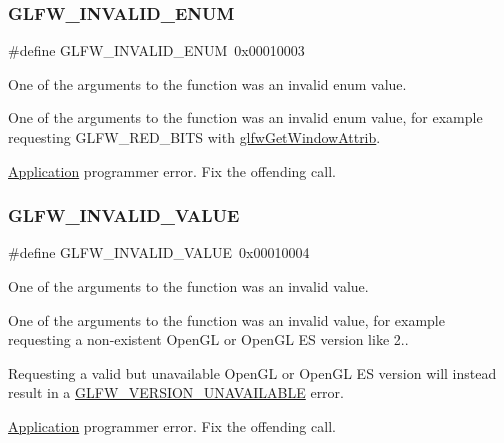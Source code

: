 \subsubsection{\texorpdfstring{G\+L\+F\+W\+\_\+\+I\+N\+V\+A\+L\+I\+D\+\_\+\+E\+N\+UM}{GLFW\_INVALID\_ENUM}\hspace{0.1cm}{\footnotesize\ttfamily [5/5]}}
{\footnotesize\ttfamily \#define G\+L\+F\+W\+\_\+\+I\+N\+V\+A\+L\+I\+D\+\_\+\+E\+N\+UM~0x00010003}



One of the arguments to the function was an invalid enum value. 

One of the arguments to the function was an invalid enum value, for example requesting G\+L\+F\+W\+\_\+\+R\+E\+D\+\_\+\+B\+I\+TS with \hyperlink{group__window_ga1bb0c7e100418e284dbb800789c63d40}{glfw\+Get\+Window\+Attrib}.

\hyperlink{classApplication}{Application} programmer error. Fix the offending call. \mbox{\label{group__errors_gaaf2ef9aa8202c2b82ac2d921e554c687}} 
\subsubsection{\texorpdfstring{G\+L\+F\+W\+\_\+\+I\+N\+V\+A\+L\+I\+D\+\_\+\+V\+A\+L\+UE}{GLFW\_INVALID\_VALUE}\hspace{0.1cm}{\footnotesize\ttfamily [1/5]}}
{\footnotesize\ttfamily \#define G\+L\+F\+W\+\_\+\+I\+N\+V\+A\+L\+I\+D\+\_\+\+V\+A\+L\+UE~0x00010004}



One of the arguments to the function was an invalid value. 

One of the arguments to the function was an invalid value, for example requesting a non-\/existent Open\+GL or Open\+GL ES version like 2..

Requesting a valid but unavailable Open\+GL or Open\+GL ES version will instead result in a \hyperlink{group__errors_gad16c5565b4a69f9c2a9ac2c0dbc89462}{G\+L\+F\+W\+\_\+\+V\+E\+R\+S\+I\+O\+N\+\_\+\+U\+N\+A\+V\+A\+I\+L\+A\+B\+LE} error.

\hyperlink{classApplication}{Application} programmer error. Fix the offending call. \mbox{\label{group__errors_gaaf2ef9aa8202c2b82ac2d921e554c687}} 
